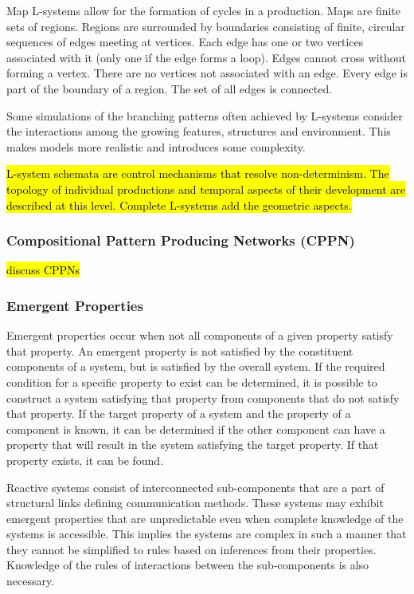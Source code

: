 Map L-systems allow for the formation of cycles in a production. Maps are finite sets of regions. Regions are surrounded by boundaries consisting of finite, circular sequences of edges meeting at vertices. Each edge has one or two vertices associated with it (only one if the edge forms a loop). Edges cannot cross without forming a vertex. There are no vertices not associated with an edge. Every edge is part of the boundary of a region. The set of all edges is connected. \cite{Prusinkiewicz2004}

Some simulations of the branching patterns often achieved by L-systems consider the interactions among the growing features, structures and environment. This makes models more realistic and introduces some complexity. \cite{Prusinkiewicz2004}

\hl{L-system schemata are control mechanisms that resolve non-determinism. The topology of individual productions and temporal aspects of their development are described at this level. Complete L-systems add the geometric aspects.} \cite{Prusinkiewicz2004}

\subsubsection{Compositional Pattern Producing Networks (CPPN)}

\hl{discuss CPPNs}

\subsubsection{Emergent Properties}

Emergent properties occur when not all components of a given property satisfy that property. An emergent property is not satisfied by the constituent components of a system, but is satisfied by the overall system. If the required condition for a specific property to exist can be determined, it is possible to construct a system satisfying that property from components that do not satisfy that property. If the target property of a system and the property of a component is known, it can be determined if the other component can have a property that will result in the system satisfying the target property. If that property exists, it can be found. \cite{Zakinthinos1998}

Reactive systems consist of interconnected sub-components that are a part of structural links defining communication methods. These systems may exhibit emergent properties that are unpredictable even when complete knowledge of the systems is accessible. This implies the systems are complex in such a manner that they cannot be simplified to rules based on inferences from their properties. Knowledge of the rules of interactions between the sub-components is also necessary. \cite{Aiguier2008}

